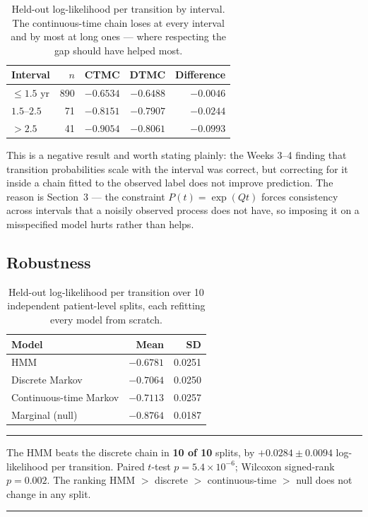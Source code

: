 \documentclass[11pt,a4paper]{article}
\newenvironment{keypoint}
  {\begin{center}\begin{minipage}{0.94\textwidth}%
   \vspace{4pt}\hrule\vspace{7pt}\small}
  {\vspace{7pt}\hrule\vspace{4pt}\end{minipage}\end{center}}
\begin{document}
\begin{table}[htbp]
\centering
\begin{tabular}{@{}lrrrr@{}}
\toprule
\textbf{Interval} & \textbf{$n$} & \textbf{CTMC} & \textbf{DTMC} & \textbf{Difference} \\
\midrule
$\leq 1.5$ yr  & 890 & $-0.6534$ & $-0.6488$ & $-0.0046$ \\
$1.5$--$2.5$   &  71 & $-0.8151$ & $-0.7907$ & $-0.0244$ \\
$> 2.5$        &  41 & $-0.9054$ & $-0.8061$ & $-0.0993$ \\
\bottomrule
\end{tabular}
\caption{Held-out log-likelihood per transition by interval. The
continuous-time chain loses at every interval and by most at long ones ---
where respecting the gap should have helped most.}
\end{table}

\noindent
This is a negative result and worth stating plainly: the Weeks 3--4 finding
that transition probabilities scale with the interval was correct, but
correcting for it inside a chain fitted to the observed label does not improve
prediction. The reason is Section~3 --- the constraint $P(t) = \exp(Qt)$ forces
consistency across intervals that a noisily observed process does not have, so
imposing it on a misspecified model hurts rather than helps.

\subsection{Robustness}

\begin{table}[htbp]
\centering
\begin{tabular}{@{}lrr@{}}
\toprule
\textbf{Model} & \textbf{Mean} & \textbf{SD} \\
\midrule
HMM                    & $\mathbf{-0.6781}$ & 0.0251 \\
Discrete Markov        & $-0.7064$ & 0.0250 \\
Continuous-time Markov & $-0.7113$ & 0.0257 \\
Marginal (null)        & $-0.8764$ & 0.0187 \\
\bottomrule
\end{tabular}
\caption{Held-out log-likelihood per transition over 10 independent
patient-level splits, each refitting every model from scratch.}
\end{table}

\begin{keypoint}
The HMM beats the discrete chain in \textbf{10 of 10} splits, by
$+0.0284 \pm 0.0094$ log-likelihood per transition. Paired $t$-test
$p = 5.4 \times 10^{-6}$; Wilcoxon signed-rank $p = 0.002$. The ranking
HMM $>$ discrete $>$ continuous-time $>$ null does not change in any split.
\end{keypoint}
\end{document}
